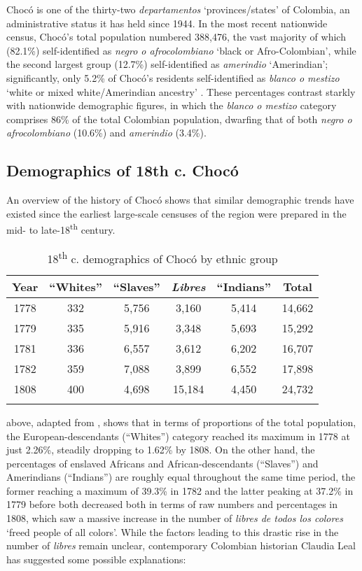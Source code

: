 \documentclass[output=paper,colorlinks,citecolor=brown]{langscibook}
\begin{document}
Chocó is one of the thirty-two \emph{departamentos} ‘provinces/states’ of Colombia, an administrative status it has held since 1944. In the most recent nationwide census, Chocó’s total population numbered 388,476, the vast majority of which (82.1\%) self-identified as \emph{negro o afrocolombiano} ‘black or Afro-Colombian’, while the second largest group (12.7\%) self-identified as \emph{amerindio} ‘Amerindian’; significantly, only 5.2\% of Chocó’s residents self-identified as \emph{blanco o mestizo} ‘white or mixed white/Amerindian ancestry’ \citep{DANE_2010}. These percentages contrast starkly with nationwide demographic figures, in which the \emph{blanco o mestizo} category comprises 86\% of the total Colombian population, dwarfing that of both \emph{negro o afrocolombiano} (10.6\%) and \emph{amerindio} (3.4\%). 


\subsection{Demographics of 18th c. Chocó}

An overview of the history of Chocó shows that similar demographic trends have existed since the earliest large-scale censuses of the region were prepared in the mid- to late-18\textsuperscript{th} century.

\begin{table}
\centering
\begin{tabular}{cccccc}
    \lsptoprule
    {Year} & {“Whites”} & {“Slaves”} & \textit{{Libres}} & {“Indians”} & {Total} \\ \midrule
    1778 & 332 & 5,756 & 3,160 & 5,414 & 14,662 \\
    1779 & 335 & 5,916 & 3,348 & 5,693 & 15,292 \\
    1781 & 336 & 6,557 & 3,612 & 6,202 & 16,707 \\
    1782 & 359 & 7,088 & 3,899 & 6,552 & 17,898 \\
    1808 & 400 & 4,698 & 15,184 & 4,450 & 24,732 \\ 
    \lspbottomrule
\end{tabular}
\caption{18\textsuperscript{th} c. demographics of Chocó by ethnic group}
\label{tab:tab1_05}
\end{table}

 above, adapted from \citet[199]{Sharp_1976}, shows that in terms of proportions of the total population, the European-descendants (“Whites”) category reached its maximum in 1778 at just 2.26\%, steadily dropping to 1.62\% by 1808. On the other hand, the percentages of enslaved Africans and African-descendants (“Slaves”) and Amerindians (“Indians”) are roughly equal throughout the same time period, the former reaching a maximum of 39.3\% in 1782 and the latter peaking at 37.2\% in 1779 before both decreased both in terms of raw numbers and percentages in 1808, which saw a massive increase in the number of \emph{libres de todos los colores} ‘freed people of all colors’. While the factors leading to this drastic rise in the number of \emph{libres} remain unclear, contemporary Colombian historian Claudia Leal has suggested some possible explanations:
\end{document}
